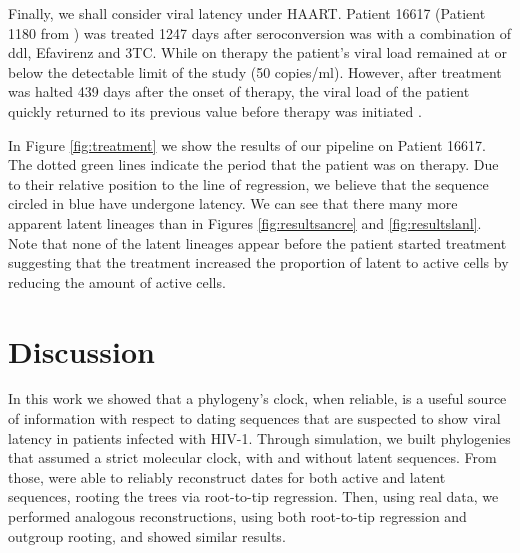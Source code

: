 \documentclass[12pt]{article}
\begin{document}

Finally, we shall consider viral latency under HAART.
Patient 16617 (Patient 1180 from \cite{Llewellyn06}) was treated 1247 days after seroconversion was with a combination of ddl, Efavirenz and 3TC.
While on therapy the patient's viral load remained at or below the detectable limit of the study (50 copies/ml).
However, after treatment was halted 439 days after the onset of therapy, the viral load of the patient quickly returned to its previous value before therapy was initiated \citep{Llewellyn06}.

In Figure \ref{fig:treatment} we show the results of our pipeline on Patient 16617.
The dotted green lines indicate the period that the patient was on therapy.
Due to their relative position to the line of regression, we believe that the sequence circled in blue have undergone latency.
We can see that there many more apparent latent lineages than in Figures \ref{fig:resultsancre} and \ref{fig:resultslanl}.
Note that none of the latent lineages appear before the patient started treatment suggesting that the treatment increased the proportion of latent to active cells by reducing the amount of active cells.

\section * {Discussion} \label{sec:discuss}

In this work we showed that a phylogeny's clock, when reliable, is a useful source of information with respect to dating sequences that are suspected to show viral latency in patients infected with HIV-1. 
Through simulation, we built phylogenies that assumed a strict molecular clock, with and without latent sequences.
From those, were able to reliably reconstruct dates for both active and latent sequences, rooting the trees via root-to-tip regression.
Then, using real data, we performed analogous reconstructions, using both root-to-tip regression and outgroup rooting, and showed similar results.
\end{document}
